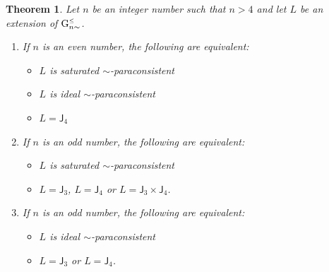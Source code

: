 \documentclass{article}
\newtheorem{theorem}{Theorem}
\theoremstyle{definition}
\newcommand{\Gnsimleq}{\mathrm{G}\mystrut^{\text{\tiny $\leq$}}_{n\sim}}
\newcommand\mystrut{\rule{0pt}{7pt}}
\begin{document}
\begin{theorem}\label{CarAlIdParGn}
Let $n$ be an integer number such that $n>4$ and let $L$ be an extension of $\Gnsimleq$.
\begin{enumerate}
\item If $n$ is an even number,  the following are equivalent:
\begin{itemize}
\item[-] $L$ is saturated $\sim$-paraconsistent 
\item[-] $L$ is ideal $\sim$-paraconsistent 
\item[-] $L=\mathsf{J}_4$
\end{itemize}
\item If $n$ is an odd number,   the following are equivalent: 
\begin{itemize}
\item[-] $L$ is saturated  $\sim$-paraconsistent
\item[-] $L=\mathsf{J}_3$, $L=\mathsf{J}_4$ or $L=\mathsf{J}_3\times \mathsf{J}_4$.
\end{itemize}
\item If $n$ is an odd number,    the following are equivalent: 
\begin{itemize}
\item[-] $L$ is ideal  $\sim$-paraconsistent 
\item[-] $L=\mathsf{J}_3$ or $L=\mathsf{J}_4$.
\end{itemize}
\end{enumerate}
\end{theorem}
\end{document}
